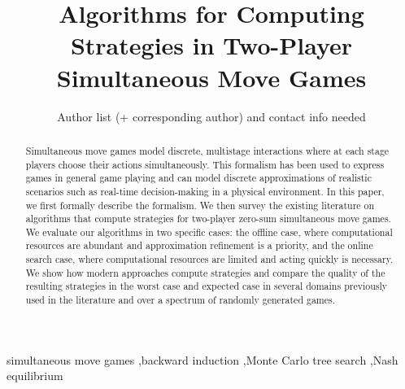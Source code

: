 \documentclass[preprint,12pt]{elsarticle}
\begin{document}
\begin{frontmatter}



\title{Algorithms for Computing Strategies in Two-Player Simultaneous Move Games}


\author{Author list (+ corresponding author) and contact info needed}

\address{}

\begin{abstract}
Simultaneous move games model discrete, multistage interactions where at each stage 
players choose their actions simultaneously. This formalism  has been used to express
games in general game playing and can model discrete approximations of realistic scenarios 
such as real-time decision-making in a physical environment. 
In this paper, we first formally describe the formalism. We then survey the existing 
literature on algorithms that compute strategies for two-player zero-sum simultaneous move games.
We evaluate our algorithms in two specific cases: the offline case, where computational 
resources are abundant and approximation refinement is a priority, and 
the online search case, where computational resources are limited and acting 
quickly is necessary.
We show how modern approaches compute strategies and compare the quality of the resulting
strategies in the worst case and expected case in several 
domains previously used in the literature and over a spectrum of randomly generated games. 
\end{abstract}

\begin{keyword}
simultaneous move games \sep backward induction \sep Monte Carlo tree search \sep Nash equilibrium

\end{keyword}

\end{frontmatter}
\end{document}
